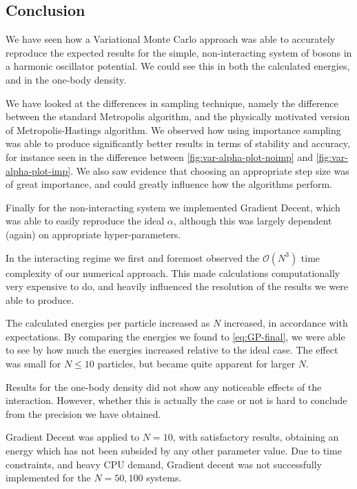 \documentclass[a4paper, 11pt]{article}
\begin{document}
\begin{multicols}{2}

\section{Conclusion}

We have seen how a Variational Monte Carlo approach was able to accurately
reproduce the expected results for the simple, non-interacting system of bosons
in a harmonic oscillator potential. We could see this in both the calculated
energies, and in the one-body density.

We have looked at the differences in sampling technique, namely the difference
between the standard Metropolis algorithm, and the physically motivated version
of Metropolis-Hastings algorithm. We observed how using importance sampling was
able to produce significantly better results in terms of stability and accuracy,
for instance seen in the difference between \autoref{fig:var-alpha-plot-noimp}
and \ref{fig:var-alpha-plot-imp}. We also saw evidence that choosing an
appropriate step size was of great importance, and could greatly influence how
the algorithms perform. 

Finally for the non-interacting system we implemented Gradient Decent, which was
able to easily reproduce the ideal $\alpha$, although this was largely dependent
(again) on appropriate hyper-parameters.

In the interacting regime we first and foremost observed the $\mathcal{O}(N^3)$
time complexity of our numerical approach. This made calculations
computationally very expensive to do, and heavily influenced the resolution of
the results we were able to produce. 

The calculated energies per particle increased as $N$ increased, in accordance
with expectations. By comparing the energies we found to \eqref{eq:GP-final}, we
were able to see by how much the energies increased relative to the ideal case.
The effect was small for $N\leq 10$ particles, but became quite apparent for
larger $N$. 

Results for the one-body density did not show any noticeable effects of the
interaction. However, whether this is actually the case or not is hard to
conclude from the precision we have obtained.

Gradient Decent was applied to $N=10$, with satisfactory results, obtaining an
energy which has not been subsided by any other parameter value. Due to time
constraints, and heavy CPU demand, Gradient decent was not successfully
implemented for the $N=50,100$ systems.



\end{multicols}
\end{document}
